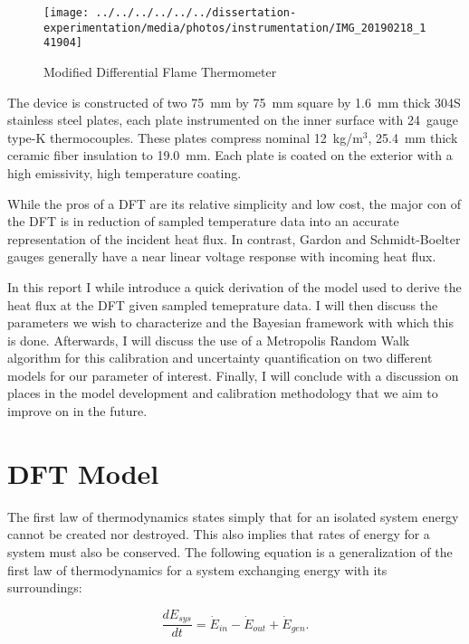 \documentclass[article]{proc}
\begin{document}
    \begin{figure}[h!]
        \centering
        \texttt{[image: ../../../../../../dissertation-experimentation/media/photos/instrumentation/IMG\_20190218\_141904]}
        \caption{Modified Differential Flame Thermometer}
        \label{fig:dft}
    \end{figure}

    The device is constructed of two 75~mm by 75~mm square by 1.6~mm thick 304S stainless steel plates, each plate instrumented on the inner surface with 24~gauge type-K thermocouples. These plates compress nominal 12~kg/m$^3$, 25.4~mm thick ceramic fiber insulation to 19.0~mm. Each plate is coated on the exterior with a high emissivity, high temperature coating. 

    While the pros of a DFT are its relative simplicity and low cost, the major con of the DFT is in reduction of sampled temperature data into an accurate representation of the incident heat flux. In contrast, Gardon and Schmidt-Boelter gauges generally have a near linear voltage response with incoming heat flux.

    In this report I while introduce a quick derivation of the model used to derive the heat flux at the DFT given sampled temeprature data. I will then discuss the parameters we wish to characterize and the Bayesian framework with which this is done. Afterwards, I will discuss the use of a Metropolis Random Walk algorithm for this calibration and uncertainty quantification on two different models for our parameter of interest. Finally, I will conclude with a discussion on places in the model development and calibration methodology that we aim to improve on in the future.

\section{DFT Model}

    The first law of thermodynamics states simply that for an isolated system energy cannot be created nor destroyed. This also implies that rates of energy for a system must also be conserved. The following equation is a generalization of the first law of thermodynamics for a system exchanging energy with its surroundings:

    \begin{equation}\label{eq:energy_stored}
        \frac{dE_{sys}}{dt} = \dot{E}_{in} - \dot{E}_{out} + \dot{E}_{gen}.
    \end{equation}
\end{document}

